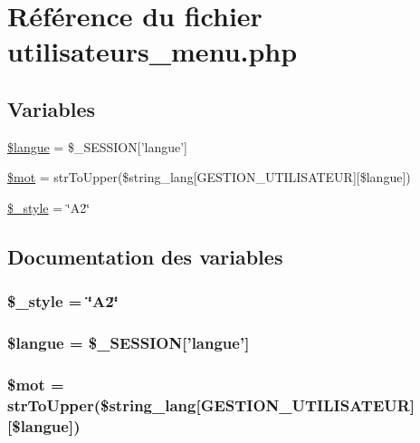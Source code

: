 \hypertarget{utilisateurs__menu_8php}{
\section{R\'{e}f\'{e}rence du fichier utilisateurs\_\-menu.php}
\label{utilisateurs__menu_8php}
}
\subsection*{Variables}
\begin{CompactItemize}
\item 
\hyperlink{utilisateurs__menu_8php_a0}{\$langue} = \$\_\-SESSION\mbox{[}'langue'\mbox{]}
\item 
\hyperlink{utilisateurs__menu_8php_a1}{\$mot} = str\-To\-Upper(\$string\_\-lang\mbox{[}GESTION\_\-UTILISATEUR\mbox{]}\mbox{[}\$langue\mbox{]})
\item 
\hyperlink{utilisateurs__menu_8php_a2}{\$\_\-style} = \char`\"{}A2\char`\"{}
\end{CompactItemize}


\subsection{Documentation des variables}
\hypertarget{utilisateurs__menu_8php_a2}{
\subsubsection[\$\_\-style]{\setlength{\rightskip}{0pt plus 5cm}\$\_\-style = \char`\"{}A2\char`\"{}}}
\label{utilisateurs__menu_8php_a2}


\hypertarget{utilisateurs__menu_8php_a0}{
\subsubsection[\$langue]{\setlength{\rightskip}{0pt plus 5cm}\$langue = \$\_\-SESSION\mbox{[}'langue'\mbox{]}}}
\label{utilisateurs__menu_8php_a0}


\hypertarget{utilisateurs__menu_8php_a1}{
\subsubsection[\$mot]{\setlength{\rightskip}{0pt plus 5cm}\$mot = str\-To\-Upper(\$string\_\-lang\mbox{[}GESTION\_\-UTILISATEUR\mbox{]}\mbox{[}\$langue\mbox{]})}}
\label{utilisateurs__menu_8php_a1}


